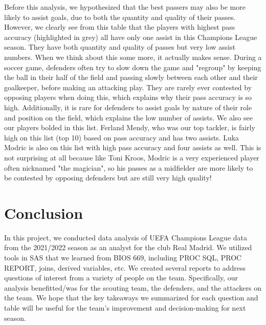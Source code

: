 \documentclass[11pt]{report}
\begin{document}
\begin{itemize}
			Before this analysis, we hypothesized that the best passers may also be more likely to assist goals, due to both the quantity and quality of their passes. However, we clearly see from this table that the players with highest pass accuracy (highlighted in grey) all have only one assist in this Champions League season. They have both quantity and quality of passes but very low assist numbers. When we think about this some more, it actually makes sense. During a soccer game, defenders often try to slow down the game and "regroup" by keeping the ball in their half of the field and passing slowly between each other and their goalkeeper, before making an attacking play. They are rarely ever contested by opposing players when doing this, which explains why their pass accuracy is so high. Additionally, it is rare for defenders to assist goals by nature of their role and position on the field, which explains the low number of assists. We also see our players bolded in this list. Ferland Mendy, who was our top tackler, is fairly high on this list (top 10) based on pass accuracy and has two assists. Luka Modric is also on this list with high pass accuracy and four assists as well. This is not surprising at all because like Toni Kroos, Modric is a very experienced player often nicknamed "the magician", so his passes as a midfielder are more likely to be contested by opposing defenders but are still very high quality!
			
	\end{itemize}

\section*{Conclusion}
In this project, we conducted data analysis of UEFA Champions League data from the 2021/2022 season as an analyst for the club Real Madrid. We utilized tools in SAS that we learned from BIOS 669, including PROC SQL, PROC REPORT, joins, derived variables, etc. We created several reports to address questions of interest from a variety of people on the team. Specifically, our analysis benefitted/was for the scouting team, the defenders, and the attackers on the team. We hope that the key takeaways we summarized for each question and table will be useful for the team's improvement and decision-making for next season. 
\end{document}
